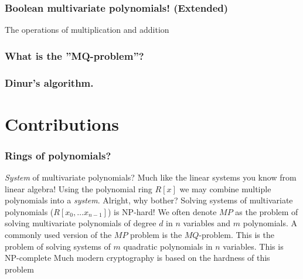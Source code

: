 \documentclass{beamer}
\begin{document}
\begin{frame}
    \frametitle{Boolean multivariate polynomials! (Extended)}
    The operations of multiplication and addition 
\end{frame}


\begin{frame}
    \frametitle{What is the ''MQ-problem''?}
\end{frame}

\begin{frame}
    \frametitle{Dinur's algorithm.}
\end{frame}

\section{Contributions}
\begin{frame}
    \frametitle{}
\end{frame}

\begin{frame}
    \frametitle{Rings of polynomials?}
    \begin{outline}
        \1 \textit{System} of multivariate polynomials?
            \2 Much like the linear systems you know from linear algebra!
            \2 Using the polynomial ring $R[x]$ we may combine multiple polynomials into a \textit{system}.
        \1 Alright, why bother?
            \2 Solving systems of multivariate polynomials ($R[x_0,\dots x_{n - 1}]$) is NP-hard!
                \3 We often denote $MP$ as the problem of solving multivariate polynomials of degree $d$ in $n$ variables and $m$ polynomials.
            \2 A commonly used version of the $MP$ problem is the $MQ$-problem.
                \3 This is the problem of solving systems of $m$ quadratic polynomials in $n$ variables.
                \3 This is NP-complete
                \3 Much modern cryptography is based on the hardness of this problem
    \end{outline}
\end{frame}
\end{document}
